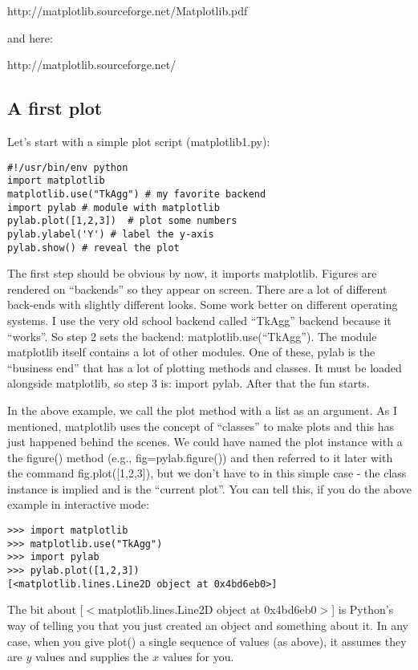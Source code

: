 {http://matplotlib.sourceforge.net/Matplotlib.pdf

\noindent
and here:

http://matplotlib.sourceforge.net/




\subsection{A first plot}

Let's start with a simple plot script ({\color{blue}matplotlib1.py}):


{\singlespacing \color{blue} \begin{verbatim}
#!/usr/bin/env python
import matplotlib
matplotlib.use("TkAgg") # my favorite backend
import pylab # module with matplotlib
pylab.plot([1,2,3])  # plot some numbers
pylab.ylabel('Y') # label the y-axis
pylab.show() # reveal the plot
\end{verbatim}}



The first step should be obvious by now, it imports {\color{blue}matplotlib}.
Figures are rendered on ``backends'' so they appear on screen.  There are a lot of different back-ends with slightly different looks.  Some work better on different operating systems.  I use the very old school backend called  ``TkAgg'' backend because it ``works''.  So step 2  sets the backend: {\color{blue}matplotlib.use(``TkAgg'')}.  The module {\color{blue}matplotlib} itself contains a lot of other modules.  One of these, 
{\color{blue}pylab} is the ``business end'' that has a lot of plotting methods and classes.  It must be  loaded alongside {\color{blue}matplotlib},   so step 3 is:  {\color{blue}import pylab}. After that the fun starts.  

In the above example, we call the {\color{blue}plot} method with a list as an argument.  As I mentioned, {\color{blue}matplotlib} uses the concept of ``classes'' to make plots and this has just happened behind the scenes. We could have named the plot instance with a the {\color{blue}figure()} method (e.g.,  {\color{blue}fig=pylab.figure()}) and then referred to it later with the command  {\color{blue}fig.plot([1,2,3])}, but we don't have to in this simple case - the class instance is implied and is the ``current plot''.  You can tell this, if you do the above example in interactive mode:

{\singlespacing \color{blue}\begin{verbatim}
>>> import matplotlib
>>> matplotlib.use("TkAgg")
>>> import pylab
>>> pylab.plot([1,2,3])
[<matplotlib.lines.Line2D object at 0x4bd6eb0>]
\end{verbatim}}
\noindent The bit about {\color{blue}[$<$matplotlib.lines.Line2D object at 0x4bd6eb0$>$]} is Python's way of telling you that you just created an object and something about it.   
In any case, when you give {\color{blue} plot()} a single sequence of values (as above), it assumes they are $y$ values and supplies the $x$ values for you.  

}
